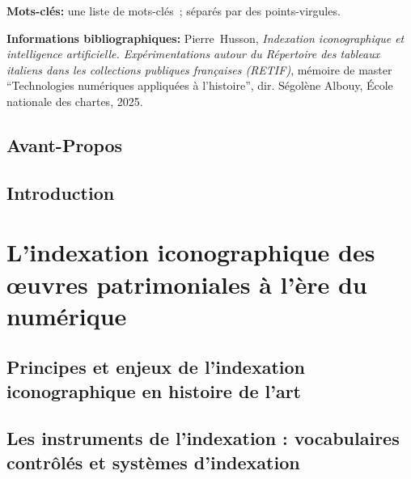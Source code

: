 \documentclass[12pt,twoside]{book}
\newcommand{\PrenomAuteur}{Pierre}
\newcommand{\NomAuteur}{Husson}
\newcommand{\Auteur}{\PrenomAuteur\ \NomAuteur}
\newcommand{\TitreMemoire}{Indexation iconographique et intelligence artificielle}
\newcommand{\SousTitreMemoire}{Expérimentations autour du Répertoire des tableaux italiens dans les collections publiques françaises (RETIF)}
\begin{document}
	\textbf{Mots-clés:} une liste de mots-clés~; séparés par des points-virgules.
	
	\textbf{Informations bibliographiques:} {\Auteur}, \textit{\TitreMemoire. \SousTitreMemoire}, mémoire de master \enquote{Technologies numériques appliquées à l'histoire}, dir. Ségolène Albouy, École nationale des chartes, 2025.
	
		\newpage{\pagestyle{empty}\cleardoublepage}
	
	\chapter{Avant-Propos}

    
	\newpage{\pagestyle{empty}\cleardoublepage}
	
\printbibliography

	
\chapter{Introduction}	


\newpage{\pagestyle{empty}\cleardoublepage}

	\mainmatter

	

	\part{L’indexation iconographique des œuvres patrimoniales à l’ère du numérique}

\chapter[Indexation : principes et enjeux]{Principes et enjeux de l’indexation iconographique en histoire de l’art}


\chapter[Les instruments de l'indexation]{Les instruments de l'indexation : vocabulaires contrôlés et systèmes d’indexation}

\end{document}
